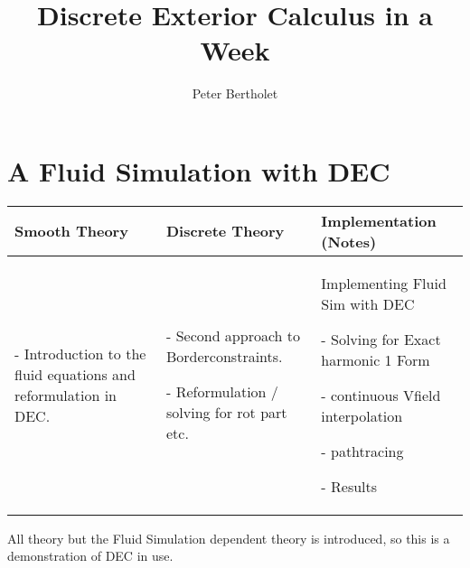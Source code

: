 \documentclass[]{scrbook}
\title{Discrete Exterior Calculus in a Week}
\author{Peter Bertholet}
\newenvironment{packed_enum}{
\begin{enumerate}
  \setlength{\itemsep}{1pt}
  \setlength{\parskip}{0pt}
  \setlength{\parsep}{0pt}
}{\end{enumerate}}
\begin{document}
	\maketitle
	\tableofcontents
	
	

	










\newpage		


\newpage	

\newpage
\chapter{A Fluid Simulation with DEC}
	\begin{longtable}{|p{4.5cm}|p{4.5cm}|p{4.5cm}|}
		\hline
		Smooth Theory& Discrete Theory& Implementation (Notes)\\
		\hline
			\begin{packed_enum}
				\item[-] Introduction to the fluid equations and reformulation in DEC.
			\end{packed_enum}
			&
			\begin{packed_enum}
				\item[-] Second approach to Borderconstraints.
				\item[-] Reformulation / solving for rot part etc.
			\end{packed_enum}
			 & 
			 Implementing Fluid Sim with DEC
			 \begin{packed_enum}
				\item[-] Solving for Exact harmonic 1 Form
				\item[-] continuous Vfield interpolation
				\item[-] pathtracing
				\item[-] Results
			\end{packed_enum}
			 \\		
		\hline
	\end{longtable}
	All theory but the Fluid Simulation dependent theory is introduced, so this is a demonstration of DEC in use.
\end{document}
